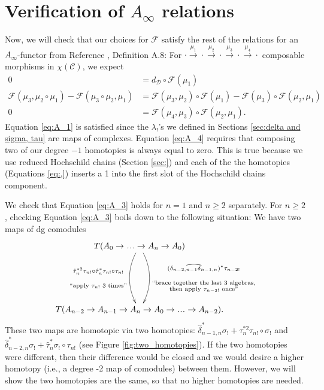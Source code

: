 
\section{Verification of $A_\infty$ relations} \label{sec:verify_A_relations}
Now, we will check that our choices 
for $\mathcal{F}$ satisfy the rest of the 
relations for an $A_\infty$-functor 
from Reference \cite{F}, Definition A.8:
For $\cdot 
\xrightarrow{\mu_1} \cdot 
\xrightarrow{\mu_2} \cdot
\xrightarrow{\mu_3} \cdot 
\xrightarrow{\mu_4} \cdot $ 
composable morphisms in $\chi(\mathcal{C})$, 
we expect
\begin{align} 
0
&= 
d_{\mathcal{D}} \circ \mathcal{F}(\mu_1)
\label{eq:A_1}\\
\mathcal{F}(\mu_3, \mu_2 \circ \mu_1) - 
  \mathcal{F}(\mu_3 \circ \mu_2, \mu_1)
&= 
\mathcal{F}(\mu_3, \mu_2) \circ \mathcal{F}(\mu_1) - 
  \mathcal{F}(\mu_3) \circ \mathcal{F}(\mu_2, \mu_1)
\label{eq:A_3}\\  
0
&= 
\mathcal{F}(\mu_4, \mu_3) \circ \mathcal{F}(\mu_2, \mu_1).  
\label{eq:A_4}
\end{align}
Equation \ref{eq:A_1} is satisfied 
since the $\lambda_!$'s we defined 
in Sections \ref{sec:delta and sigma, tau} are maps 
of complexes. Equation \ref{eq:A_4} requires 
that composing two of our 
degree $-1$ homotopies is always equal to 
zero. This is true because we use 
reduced Hochschild chains (Section \ref{sec:}) 
and each of the the homotopies (Equations \ref{eq:,}) inserts a 1 into the first slot of the 
Hochschild chains component. 

We check that Equation \ref{eq:A_3} holds for 
$n=1$ and $n \geq 2$ separately. For $n\geq2$, 
checking Equation \ref{eq:A_3} boils down 
to the following situation:
We have two maps of dg comodules
\begin{equation}
\label{eq:two_maps}
\xymatrixrowsep{5pc}
\xymatrix{
T(A_0 \to \smdots \to A_n \to A_0) 
 \ar@/^1pc/[d]^{\substack{
   (\widehat{\delta_{n-2,n-1}\delta_{n-1,n}})^*
   \tau_{n-2!}\\\\\\
   \textrm{$``$brace together the last 3 algebras,}\\
   \textrm{then apply $\tau_{n-2!}$ once''}}}
 \ar@/_1pc/[d]_{\substack{
   \hat{\tau}_n^{*2} \tau_{n!}\circ
   \hat{\tau}_n^*\tau_{n!}\circ \tau_{n!}\\\\\\
   \textrm{$``$apply $\tau_{n!}$ 3 times''}}}\\
T(A_{n-2} \to A_{n-1} \to A_n \to 
A_0 \to \smdots \to A_{n-2}).
}
\end{equation}
These two maps are homotopic via 
two homotopies: 
$\hat{\delta}_{n-1,n}^*\sigma_!
+ \tau_n^{*2}\tau_{n!} \circ \sigma_!$ 
and 
$\hat{\delta}_{n-2,n}^*\sigma_! +
\hat{\tau}_n^*\sigma_!
\circ \tau_{n!}$ (see Figure 
\ref{fig:two_homotopies}). If the 
two homotopies were different, then 
their difference would be closed and
we would desire a higher homotopy (i.e., 
a degree -2 map of comodules) between 
them. However, we will show the 
two homotopies are the same, so that 
no higher homotopies are needed. 

